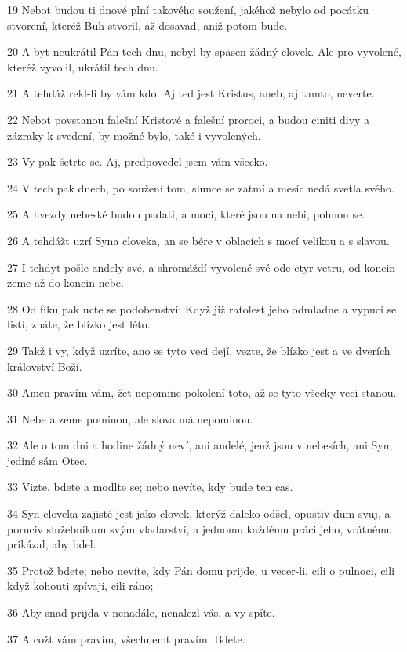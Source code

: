 \par 19 Nebot budou ti dnové plní takového soužení, jakéhož nebylo od pocátku stvorení, kteréž Buh stvoril, až dosavad, aniž potom bude.
\par 20 A byt neukrátil Pán tech dnu, nebyl by spasen žádný clovek. Ale pro vyvolené, kteréž vyvolil, ukrátil tech dnu.
\par 21 A tehdáž rekl-li by vám kdo: Aj ted jest Kristus, aneb, aj tamto, neverte.
\par 22 Nebot povstanou falešní Kristové a falešní proroci, a budou ciniti divy a zázraky k svedení, by možné bylo, také i vyvolených.
\par 23 Vy pak šetrte se. Aj, predpovedel jsem vám všecko.
\par 24 V tech pak dnech, po soužení tom, slunce se zatmí a mesíc nedá svetla svého.
\par 25 A hvezdy nebeské budou padati, a moci, které jsou na nebi, pohnou se.
\par 26 A tehdážt uzrí Syna cloveka, an se bére v oblacích s mocí velikou a s slavou.
\par 27 I tehdyt pošle andely své, a shromáždí vyvolené své ode ctyr vetru, od koncin zeme až do koncin nebe.
\par 28 Od fíku pak ucte se podobenství: Když již ratolest jeho odmladne a vypucí se listí, znáte, že blízko jest léto.
\par 29 Takž i vy, když uzríte, ano se tyto veci dejí, vezte, že blízko jest a ve dverích království Boží.
\par 30 Amen pravím vám, žet nepomine pokolení toto, až se tyto všecky veci stanou.
\par 31 Nebe a zeme pominou, ale slova má nepominou.
\par 32 Ale o tom dni a hodine žádný neví, ani andelé, jenž jsou v nebesích, ani Syn, jediné sám Otec.
\par 33 Vizte, bdete a modlte se; nebo nevíte, kdy bude ten cas.
\par 34 Syn cloveka zajisté jest jako clovek, kterýž daleko odšel, opustiv dum svuj, a poruciv služebníkum svým vladarství, a jednomu každému práci jeho, vrátnému prikázal, aby bdel.
\par 35 Protož bdete; nebo nevíte, kdy Pán domu prijde, u vecer-li, cili o pulnoci, cili když kohouti zpívají, cili ráno;
\par 36 Aby snad prijda v nenadále, nenalezl vás, a vy spíte.
\par 37 A cožt vám pravím, všechnemt pravím: Bdete.

